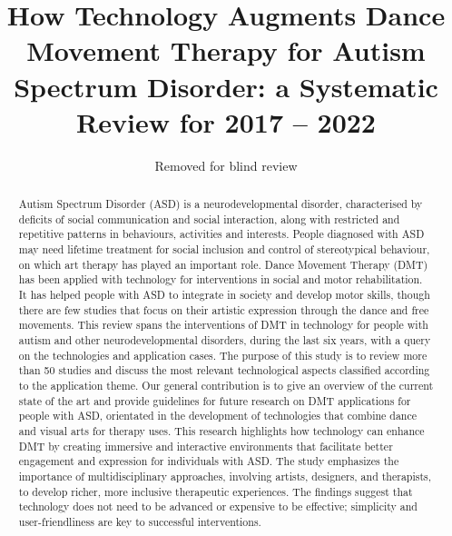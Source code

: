 \documentclass[a4paper,fleqn]{cas-sc}
\begin{document}
\let\WriteBookmarks\relax
\def\floatpagepagefraction{1}
\def\textpagefraction{.001}



\title[mode = title]{How Technology Augments Dance Movement Therapy for Autism Spectrum Disorder: a Systematic Review for 2017 -- 2022}


\author[]{Removed for blind review}            

\begin{abstract}
Autism Spectrum Disorder (ASD) is a neurodevelopmental disorder, characterised by deficits of social communication and social interaction, along with restricted and repetitive patterns in behaviours, activities and interests. People diagnosed with ASD may need lifetime treatment for social inclusion and control of stereotypical behaviour, on which art therapy has played an important role.
Dance Movement Therapy (DMT) has been applied with technology for interventions in social and motor rehabilitation. It has helped people with ASD to integrate in society and develop motor skills, though there are few studies that focus on their artistic expression through the dance and free movements.
This review spans the interventions of DMT in technology for people with autism and other neurodevelopmental disorders, during the last six years, with a query on the technologies and application cases. The purpose of this study is to review more than 50 studies and discuss the most relevant technological aspects classified according to the application theme.
Our general contribution is to give an overview of the current state of the art and provide guidelines for future research on DMT applications for people with ASD, orientated in the development of technologies that combine dance and visual arts for therapy uses.
This research highlights how technology can enhance DMT by creating immersive and interactive environments that facilitate better engagement and expression for individuals with ASD. The study emphasizes the importance of multidisciplinary approaches, involving artists, designers, and therapists, to develop richer, more inclusive therapeutic experiences. The findings suggest that technology does not need to be advanced or expensive to be effective; simplicity and user-friendliness are key to successful interventions.
\end{abstract}
\end{document}
